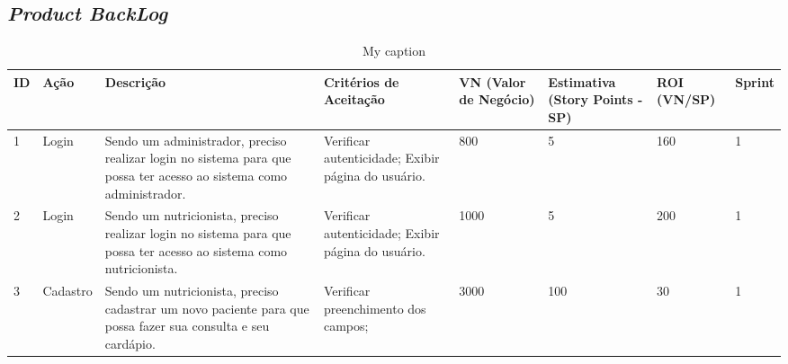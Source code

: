 \documentclass[
	12pt,				%
    oneside,			%
	a4paper,			%
	english,			%
	french,				%
	spanish,			%
	brazil,				%
	]{abntex2}
\begin{document}

\begin{apendicesenv}
\partapendices

\begin{landscape}
\chapter{\textit{Product BackLog}}
\begin{table}[h]
\centering
\caption{My caption}
\label{my-label}
\begin{tabular}{|p{0.5cm}|p{2cm}|p{5cm}|p{4cm}|p{2.5cm}|p{3.7cm}|p{2cm}|p{2cm}|}
\hline
\textbf{ID} & \textbf{Ação} & \textbf{Descrição}                                                                                                 & \textbf{Critérios de Aceitação} & \textbf{VN (Valor de Negócio)} & \textbf{Estimativa (Story Points - SP)} & \textbf{ROI (VN/SP)} & \textbf{Sprint} \\ \hline
1                               & Login                             & Sendo um administrador, preciso realizar login no sistema para que possa ter acesso ao sistema como administrador. & Verificar autenticidade; Exibir página do usuário.  & 800                                                & 5                                                           & 160                                      & 1                                   \\ \hline
2                               & Login                             & Sendo um nutricionista, preciso realizar login no sistema para que possa ter acesso ao sistema como nutricionista. & Verificar autenticidade; Exibir página do usuário.  & 1000                                               & 5                                                           & 200                                      & 1                                   \\ \hline
3                               & Cadastro                          & Sendo um nutricionista, preciso cadastrar um novo paciente para que possa fazer sua consulta e seu cardápio.       & Verificar preenchimento dos campos;                 & 3000                                               & 100                                                         & 30                                       & 1                                   \\ \hline

\end{tabular}
\end{table}
\end{landscape}
\end{apendicesenv}
\end{document}
